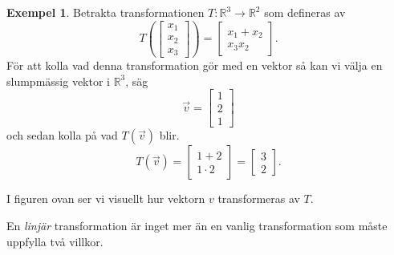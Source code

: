\documentclass{article}
\theoremstyle{definition}
\newtheorem{exmp}[thm]{Exempel}
\begin{document}
\begin{exmp}
  Betrakta transformationen $T: \mathbb{R}^3 \rightarrow \mathbb{R}^2$ som defineras av 
\[T \left(
  \begin{bmatrix}
    x_1 \\
    x_2 \\
    x_3
  \end{bmatrix}
\right) = 
\begin{bmatrix}
  x_1 + x_2 \\
  x_3 x_2 
\end{bmatrix}.
\]
För att kolla vad denna transformation gör med en vektor 
så kan vi välja en slumpmässig vektor i $\mathbb{R}^3$, säg
\[\vec{v} = 
\begin{bmatrix}
  1 \\
  2 \\
  1
\end{bmatrix}
\]
och sedan kolla på vad $T(\vec{v})$ blir. 
\[T(\vec{v}) = 
\begin{bmatrix}
  1 + 2 \\
  1 \cdot 2
\end{bmatrix} = 
\begin{bmatrix}
  3 \\
  2
\end{bmatrix}.
\]

\begin{center}
\end{center}
I figuren ovan ser vi visuellt hur vektorn $v$ transformeras av $T$. 
\end{exmp}

En \textit{linjär} transformation är inget mer än en vanlig transformation som måste uppfylla två villkor. 
\end{document}
